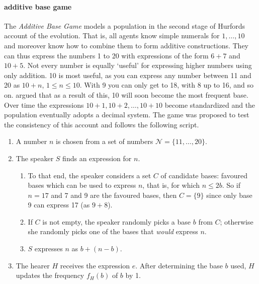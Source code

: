 \documentclass{../src/bcthesispart}
\begin{document}
\paragraph{additive base game}
The \emph{Additive Base Game} models a population in the second stage of Hurfords account of the evolution.
That is, all agents know simple numerals for $1, \dots, 10$ and moreover know how to combine them to form additive constructions.
They can thus express the numbers 1 to 20 with expressions of the form $6+7$ and $10+5$.
Not every number is equally ‘useful’ for expressing higher numbers using only addition.
10 is most useful, as you can express any number between 11 and 20 as $10 + n$, $1\le n \le 10$. 
With 9 you can only get to 18, with 8 up to 16, and so on. 
\textcite{Hurford1987} argued that as a result of this, 10 will soon become the most frequent base.
Over time the expressions $10+1, 10+2, \dots, 10+10$ become standardized and the population eventually adopts a decimal system.
The game was proposed to test the consistency of this account and follows the following script.
\begin{enumerate}
	\item A number $n$ is chosen from a set of numbers $\mathcal{N} = \{11, \dots, 20\}$.

	\item The speaker $S$ finds an expression for $n$. 
		\begin{enumerate}
			\item To that end, the speaker considers a set $C$ of candidate bases: favoured bases which can be used to express $n$, that is, for which $n \le 2b$.
				So if $n=17$ and 7 and 9 are the favoured bases, then $C = \{9\}$ since only base 9 can express 17 (as $9+8$).
			\item If $C$ is not empty, the speaker randomly picks a base $b$ from $C$; otherwise she randomly picks one of the bases that \emph{would} express $n$.
			\item $S$ expresses $n$ as $b + (n-b)$.
		\end{enumerate} 
		
	\item The hearer $H$ receives the expression $e$. After determining the base $b$ used, $H$ updates the frequency $f_H(b)$ of $b$ by 1.
\end{enumerate}
\end{document}
